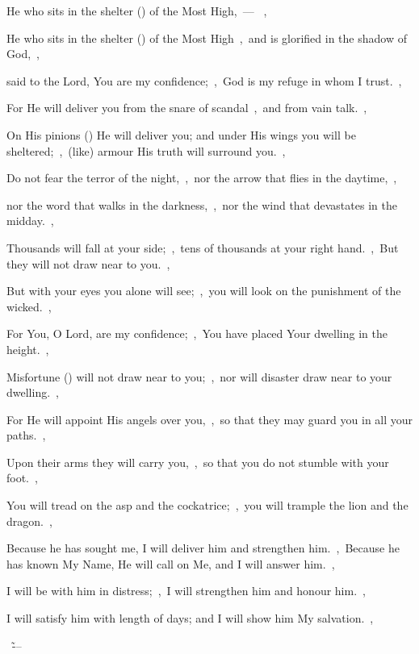 \documentclass[12pt,twoside,a5paper]{article}
\begin{document}
\begin{halfparskip}
   He who sits in the shelter () of the Most High,~--- ~\sep

  He who sits in the shelter () of the Most High~\sep\ and is glorified in the shadow of God,~\sep

  said to the Lord, You are my confidence;~\sep\ God is my refuge in whom I trust.~\sep

  For He will deliver you from the snare of scandal~\sep\ and from vain talk.~\sep

  On His pinions () He will deliver you; and under His wings you will be sheltered;~\sep\ (like) armour His truth will surround you.~\sep

  Do not fear the terror of the night,~\sep\ nor the arrow that flies in the daytime,~\sep

  nor the word that walks in the darkness,~\sep\ nor the wind that devastates in the midday.~\sep

  Thousands will fall at your side;~\sep\ tens of thousands at your right hand.~\sep\ But they will not draw near to you.~\sep

  But with your eyes you alone will see;~\sep\ you will look on the punishment of the wicked.~\sep

  For You, O Lord, are my confidence;~\sep\ You have placed Your dwelling in the height.~\sep

  Misfortune () will not draw near to you;~\sep\ nor will disaster draw near to your dwelling.~\sep

  For He will appoint His angels over you,~\sep\ so that they may guard you in all your paths.~\sep

  Upon their arms they will carry you,~\sep\ so that you do not stumble with your foot.~\sep

  You will tread on the asp and the cockatrice;~\sep\ you will trample the lion and the dragon.~\sep

  Because he has sought me, I will deliver him and strengthen him.~\sep\ Because he has known My Name, He will call on Me, and I will answer him.~\sep

  I will be with him in distress;~\sep\ I will strengthen him and honour him.~\sep

  I will satisfy him with length of days; and I will show him My salvation.~\sep

  \enbriefglory\ \enbrieffrom\~--- 

\end{halfparskip}
\end{document}
